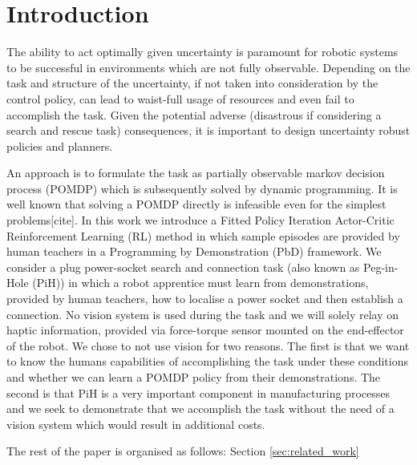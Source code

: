 \documentclass[final,3p,times,twocolumn]{elsarticle}
\begin{document}


\section{Introduction}

The ability to act optimally given uncertainty is paramount for robotic systems to be successful in
environments which are not fully observable. Depending on the task and structure of the uncertainty, 
if not taken into consideration by the control policy, can lead to waist-full usage of resources 
and even fail to accomplish the task. Given the potential adverse (disastrous if considering a 
search and rescue task) consequences, it is important to design uncertainty robust policies and planners.

An approach is to formulate the task as partially observable markov decision process (POMDP) which is subsequently
solved by dynamic programming. It is well known that solving a POMDP directly is infeasible even for 
the simplest problems[cite]. 
In this work we introduce a Fitted Policy Iteration Actor-Critic Reinforcement Learning (RL) method in which 
sample episodes are provided by human teachers in a Programming by Demonstration (PbD) framework. 
We consider a plug power-socket search and connection task (also known as Peg-in-Hole (PiH)) in 
which a robot apprentice must learn from demonstrations, provided by human teachers, how to localise 
a power socket and then establish a connection. No vision system is used during the task and 
we will solely relay on haptic information, provided via force-torque sensor mounted on the end-effector 
of the robot. We chose to not use vision for two reasons. The first is that we want to 
know the humans capabilities of accomplishing the task under these conditions and whether 
we can learn a POMDP policy from their demonstrations. The second is that PiH is a very important 
component in manufacturing processes and we seek to demonstrate that we accomplish the task without 
the need of a vision system which would result in additional costs.

The rest of the paper is organised as follows: Section \ref{sec:related_work}
\end{document}
